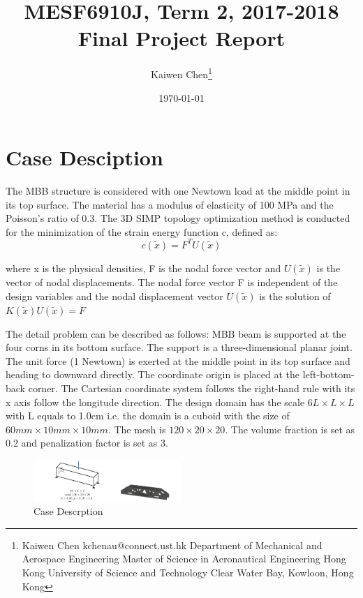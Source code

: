 \documentclass{article}
\begin{document}
\title{MESF6910J, Term 2, 2017-2018\\Final Project Report}
\author{Kaiwen Chen\thanks{Kaiwen Chen
\newline kchenau@connect.ust.hk
\newline
\newline Department of Mechanical and Aerospace Engineering
\newline Master of Science in Aeronautical Engineering
\newline Hong Kong University of Science and Technology
\newline Clear Water Bay, Kowloon, Hong Kong}}
\date{\today}

\maketitle

\section{Case Desciption}
The MBB structure is considered with one Newtown load at the middle point in its top surface. The material has a modulus of elasticity of 100 MPa and the Poisson’s ratio of 0.3. The 3D SIMP topology optimization method is conducted for the minimization of the strain energy function c, defined as:\\
$$c(\tilde{x})=F^TU(\tilde{x}) $$

where x is the physical densities, F is the nodal force vector and $U(\tilde{x})$ is the vector of nodal displacements. The nodal force vector F is independent of the design variables and the nodal displacement vector $U(\tilde{x})$ is the solution of $K(\tilde{x})U(\tilde{x})=F$

The detail problem can be described as follows: MBB beam is supported at the four corns in its bottom surface. The support is a three-dimensional planar joint. The unit force (1 Newtown) is exerted at the middle point in its top surface and heading to downward directly. The coordinate origin is placed at the left-bottom-back corner. The Cartesian coordinate system follows the right-hand rule with its x axis follow the longitude direction. The design domain has the scale $6L\times L\times L$ with L equals to 1.0cm i.e. the domain is a cuboid with the size of $60mm\times10mm\times10mm$. The mesh is $120\times20\times20$. The volume fraction is set as 0.2 and penalization factor is set as 3.


\begin{figure}[!htb]
\centering
\includegraphics[width=0.5\textwidth]{CaseDescription}
\caption{Case Descrption}
\end{figure}
\FloatBarrier
\end{document}
